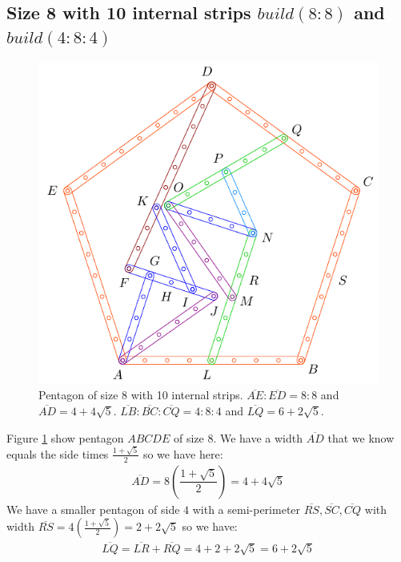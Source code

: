 \documentclass[11pt]{article}
\begin{document}
\subsection{Size 8 with 10 internal strips $build(8:8)$ and $build(4:8:4)$}

\begin{figure}[H]
\centering
\includegraphics[scale=1]{8/penta8-10c}
\caption{Pentagon of size 8 with 10 internal strips. $\overline{AE}:\overline{ED} = 8:8$ and $\overline{AD} = 4 + 4\sqrt5$. $\overline{LB}:\overline{BC}:\overline{CQ} = 4:8:4$ and $\overline{LQ} = 6 + 2\sqrt5$.}
\label{fig:penta8-10c}
\end{figure}

Figure \ref{fig:penta8-10c} show pentagon $ABCDE$ of size $8$. We have a width $\overline{AD}$ that we know equals the side times $\frac{1+\sqrt5}2$ so we have here:
\begin{align}
\overline{AD} = 8\left(\dfrac{1+\sqrt5}2\right) = 4 + 4\sqrt5
\end{align}
We have a smaller pentagon of side $4$ with a semi-perimeter $\overline{RS},\overline{SC},\overline{CQ}$ with width $\overline{RS} = 4\left(\frac{1+\sqrt5}2\right) = 2 + 2\sqrt5$ so we have:
\begin{align}
\overline{LQ} = \overline{LR} + \overline{RQ} = 4 + 2 + 2\sqrt5 = 6 + 2\sqrt5
\end{align}
\end{document}
